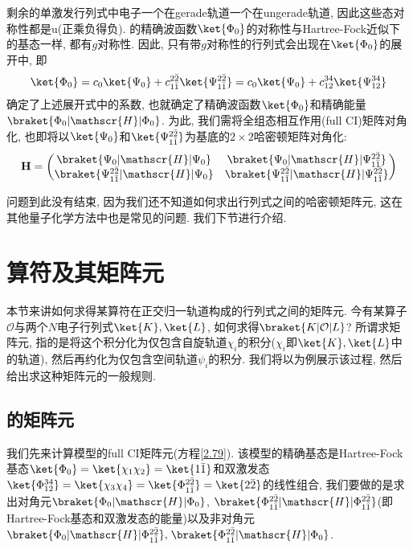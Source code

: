 剩余的单激发行列式中电子一个在gerade轨道一个在ungerade轨道, 
因此这些态对称性都是u(正乘负得负). 
的精确波函数$\ket{\Phi_0}$的对称性与Hartree-Fock近似下的基态一样, 
都有$g$对称性. 
因此, 
只有带$g$对称性的行列式会出现在$\ket{\Phi_0}$的展开中, 
即
\begin{equation}
\ket{\Phi_0}=c_0\ket{\Psi_0} + c_{1\bar{1}}^{2\bar{2}}\ket{\Psi_{1\bar{1}}^{2\bar{2}}}=c_0\ket{\Psi_0} + c_{12}^{34}\ket{\Psi_{12}^{34}}
\end{equation}
确定了上述展开式中的系数, 
也就确定了精确波函数$\ket{\Phi_0}$和精确能量$\braket{\Phi_0|\mathscr{H}|\Phi_0}$. 
为此, 
我们需将全组态相互作用(full CI)矩阵对角化, 
也即将以$\ket{\Psi_0}$和$\ket{\Psi_{1\bar{1}}^{2\bar{2}}}$为基底的$2\times 2$哈密顿矩阵对角化:
\begin{equation}
	\label{2.79}
	\mathbf{H}=
	\begin{pmatrix}
		\braket{{\Psi_0}|\mathscr{H} | {\Psi_0}} & \braket{{\Psi_0} |\mathscr{H} |{\Psi_{1\bar{1}}^{2\bar{2}}}}\\
		\braket{{\Psi_{1\bar{1}}^{2\bar{2}}}|\mathscr{H} | {\Psi_0}} & \braket{{\Psi_{1\bar{1}}^{2\bar{2}}} |\mathscr{H} |{\Psi_{1\bar{1}}^{2\bar{2}}}}
	\end{pmatrix}
\end{equation}

问题到此没有结束, 
因为我们还不知道如何求出行列式之间的哈密顿矩阵元, 
这在其他量子化学方法中也是常见的问题. 
我们下节进行介绍.


\section{算符及其矩阵元 }
 \label{sec2.3}
本节来讲如何求得某算符在正交归一轨道构成的行列式之间的矩阵元. 
今有某算子$\mathcal{O}$与两个$N$电子行列式$\ket{K},\ket{L}$, 
如何求得$\braket{K|\mathcal{O}|L}$? 所谓求矩阵元, 
指的是将这个积分化为仅包含自旋轨道$\chi_i$的积分($\chi_i$即$\ket{K},\ket{L}$中的轨道), 
然后再约化为仅包含空间轨道$\psi_i$的积分. 
 我们将以为例展示该过程, 
然后给出求这种矩阵元的一般规则.


\subsection{的矩阵元}
 \label{sec2.3.1}
我们先来计算模型的full CI矩阵元(方程\autoref{2.79}). 
该模型的精确基态是Hartree-Fock基态$\ket{\Phi_0}=\ket{\chi_1\chi_2}=\ket{1\bar{1}}$和双激发态$\ket{\Phi_{12}^{34}}=\ket{\chi_3\chi_4}=\ket{\Phi_{1\bar{1}}^{2\bar{2}}}=\ket{2\bar{2}}$的线性组合, 
我们要做的是求出对角元$\braket{{\Phi_0}|\mathscr{H} | {\Phi_0}}$, 
$\braket{{\Phi_{1\bar{1}}^{2\bar{2}}} |\mathscr{H} |{\Phi_{1\bar{1}}^{2\bar{2}}}}$(即Hartree-Fock基态和双激发态的能量)以及非对角元$\braket{{\Phi_0} |\mathscr{H} |{\Phi_{1\bar{1}}^{2\bar{2}}}},$$\,\braket{{\Phi_{1\bar{1}}^{2\bar{2}}}|\mathscr{H} | {\Phi_0}}$.


